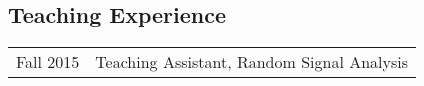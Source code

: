 \documentclass[margin,line,pifont,palatino,courier]{res}
\newenvironment{list1}{
  \begin{list}{\ding{113}}{%
      \setlength{\itemsep}{0in}
      \setlength{\parsep}{0in} \setlength{\parskip}{0in}
      \setlength{\topsep}{0in} \setlength{\partopsep}{0in}
      \setlength{\leftmargin}{0.17in}}}{\end{list}}
\begin{document}
\begin{resume}
\section{\sc Teaching Experience}
\begin{tabular}{@{}p{0.9in} p{4in}}
Fall 2015 & Teaching Assistant, Random Signal Analysis \\
\end{tabular}


%
%
%


\end{resume}
\end{document}
